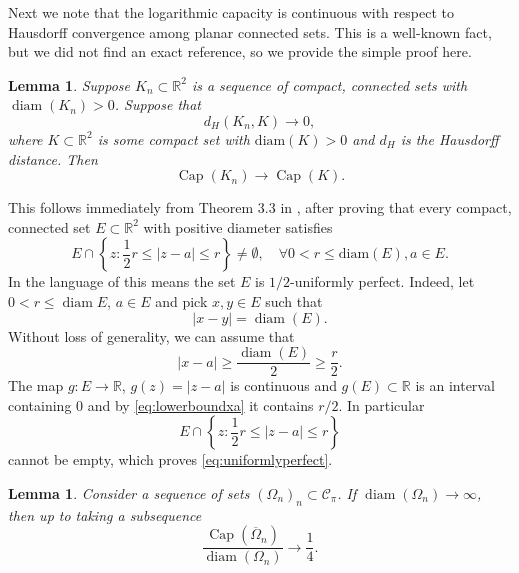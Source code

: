 \documentclass[11pt]{article}
\theoremstyle{plain}
\numberwithin{equation}{section}
\newtheorem{lemma}[theorem]{Lemma}
\theoremstyle{definition}
\let\oldendproof\endproof
\renewenvironment{proof}[1][\proofname]{%
\oldproof[\upshape \bfseries #1]%
}{\oldendproof}
\DeclareMathOperator{\cp}{Cap}
\DeclareMathOperator{\diam}{diam}
\def \Om{\Omega}
\def \R {\mathbb{R}}
\def \mc{\mathcal}
\begin{document}
    Next we note that the logarithmic capacity is continuous with respect to Hausdorff convergence among planar connected sets. This is a well-known fact, but we did not find an exact reference, so we provide the simple proof here.
    \begin{lemma}
        \label{lem:ContinuityOfLogCap}
        Suppose $K_n\subset \R^2$ is a sequence of compact, connected sets with $\diam(K_n)>0$. Suppose that
        \[
        d_H(K_n,K)\to 0,
        \]
        where $K \subset \R^2$ is some compact set with $\mathrm{diam}(K)>0$ and $d_H$ is the Hausdorff distance. Then
        \[
        \cp(K_n)\to\cp(K).
        \]
    \end{lemma}
    \begin{proof}
        This follows immediately from Theorem 3.3 in \cite{kalmykov2022continuity}, after proving that every compact, connected set $E\subset \R^2$ with positive diameter satisfies
        \begin{equation}
            \label{eq:uniformlyperfect}
            E\cap \left\{z:\frac{1}{2} r \leq |z-a|\leq r\right\}\neq \emptyset,\quad \forall0< r\leq \mathrm{diam}(E),a\in E.
        \end{equation}
        In the language of \cite{kalmykov2022continuity} this means the set $E$ is $1/2$-uniformly perfect. Indeed, let $0<r\leq \diam E$, $a \in E$ and pick $x,y \in E$ such that
        \[
        |x-y|=\diam (E).
        \]
        Without loss of generality, we can assume that
        \begin{equation}
            \label{eq:lowerboundxa}
            |x-a|\geq \frac{\diam (E)}{2}\geq \frac r2.
        \end{equation}
        The map $g:E \to \R$, $g(z)=|z-a|$ is continuous and $g(E)\subset \R$ is an interval containing $0$ and by \eqref{eq:lowerboundxa} it contains $r/2$. In particular
        \[
        E\cap \left\{z:\frac{1}{2} r \leq |z-a|\leq r\right\}
        \]
        cannot be empty, which proves \eqref{eq:uniformlyperfect}.
    \end{proof}
    \begin{lemma}
        \label{lem:RatBound}
        Consider a sequence of sets $(\Om_n)_n \subset \mc C_\pi$. If $\diam(\Om_n)\to \infty$, then up to taking a subsequence
        \[
        \frac{\cp(\overline \Om_n)}{\diam(\Om_n)}\to \frac14.
        \]
    \end{lemma}
\end{document}

